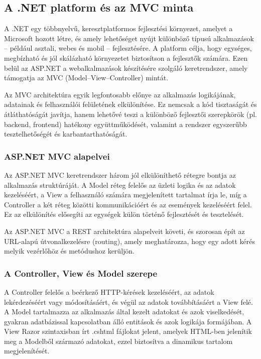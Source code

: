 \subsection{A .NET platform és az MVC minta}

\indent A .NET egy többnyelvű, keresztplatformos fejlesztési környezet, amelyet a Microsoft hozott létre, és amely lehetőséget nyújt különböző típusú alkalmazások – például asztali, webes és mobil – fejlesztésére. A platform célja, hogy egységes, megbízható és jól skálázható környezetet biztosítson a fejlesztők számára. Ezen belül az ASP.NET a webalkalmazások készítésére szolgáló keretrendszer, amely támogatja az MVC (Model–View–Controller) mintát.

Az MVC architektúra egyik legfontosabb előnye az alkalmazás logikájának, adatainak és felhasználói felületének elkülönítése. Ez nemcsak a kód tisztaságát és átláthatóságát javítja, hanem lehetővé teszi a különböző fejlesztői szerepkörök (pl. backend, frontend) hatékony együttműködését, valamint a rendszer egyszerűbb tesztelhetőségét és karbantarthatóságát.

\subsubsection{ASP.NET MVC alapelvei}

\indent Az ASP.NET MVC keretrendszer három jól elkülöníthető rétegre bontja az alkalmazás struktúráját. A Model réteg felelős az üzleti logika és az adatok kezeléséért, a View a felhasználó számára megjelenített tartalmat írja le, míg a Controller a két réteg közötti kommunikációért és az események kezeléséért felel. Ez az elkülönítés elősegíti az egységek külön történő fejlesztését és tesztelését.

Az ASP.NET MVC a REST architektúra alapelveit követi, és szorosan épít az URL-alapú útvonalkezelésre (routing), amely meghatározza, hogy egy adott kérés melyik vezérlőhöz és metódushoz kerüljön.

\subsubsection{A Controller, View és Model szerepe}

\indent A Controller felelős a beérkező HTTP-kérések kezeléséért, az adatok lekérdezéséért vagy módosításáért, és végül az adatok továbbításáért a View felé. A Model tartalmazza az alkalmazás által kezelt adatokat és azok viselkedését, gyakran adatbázissal kapcsolatban álló entitások és azok logikája formájában. A View Razor szintaxisban írt .cshtml fájlokat jelent, amelyek HTML-ben jelenítik meg a Modelből származó adatokat, ezzel biztosítva a dinamikus tartalom megjelenítését.


